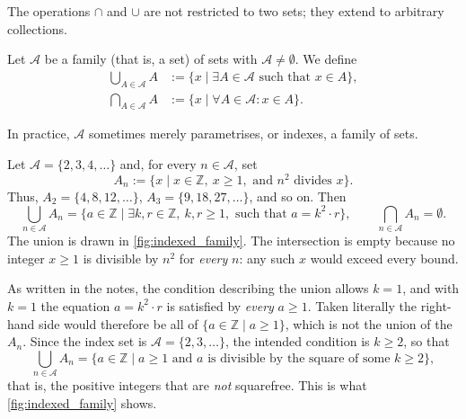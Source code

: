 The operations $\cap$ and $\cup$ are not restricted to two sets; they extend to arbitrary collections.

\begin{definition}
\label{def:family_union_intersection}
Let $\mathcal{A}$ be a family (that is, a set) of sets with $\mathcal{A} \ne \emptyset$. We define
\begin{align*}
\bigcup_{A \in \mathcal{A}} A &:= \{ x \mid \exists A \in \mathcal{A} \text{ such that } x \in A \}, \\
\bigcap_{A \in \mathcal{A}} A &:= \{ x \mid \forall A \in \mathcal{A} : x \in A \}.
\end{align*}
\end{definition}

In practice, $\mathcal{A}$ sometimes merely parametrises, or indexes, a family of sets.

\begin{example}
\label{ex:indexed_family}
Let $\mathcal{A} = \{2, 3, 4, \dots\}$ and, for every $n \in \mathcal{A}$, set
\[
A_n := \{ x \mid x \in \mathbb{Z}, \ x \ge 1, \text{ and } n^2 \text{ divides } x \}.
\]
Thus, $A_2 = \{4, 8, 12, \dots\}$, $A_3 = \{9, 18, 27, \dots\}$, and so on. Then
\[
\bigcup_{n \in \mathcal{A}} A_n = \{ a \in \mathbb{Z} \mid \exists k, r \in \mathbb{Z}, \ k, r \ge 1, \text{ such that } a = k^2 \cdot r \},
\qquad
\bigcap_{n \in \mathcal{A}} A_n = \emptyset .
\]
The union is drawn in \cref{fig:indexed_family}. The intersection is empty because no integer $x \ge 1$ is divisible by $n^2$ for \textit{every} $n$: any such $x$ would exceed every bound.
\end{example}

\begin{ainote}
As written in the notes, the condition describing the union allows $k = 1$, and with $k = 1$ the equation $a = k^2 \cdot r$ is satisfied by \textit{every} $a \ge 1$. Taken literally the right-hand side would therefore be all of $\{a \in \mathbb{Z} \mid a \ge 1\}$, which is not the union of the $A_n$. Since the index set is $\mathcal{A} = \{2, 3, \dots\}$, the intended condition is $k \ge 2$, so that
\[
\bigcup_{n \in \mathcal{A}} A_n = \{ a \in \mathbb{Z} \mid a \ge 1 \text{ and } a \text{ is divisible by the square of some } k \ge 2 \},
\]
that is, the positive integers that are \textit{not} squarefree. This is what \cref{fig:indexed_family} shows.
\end{ainote}

